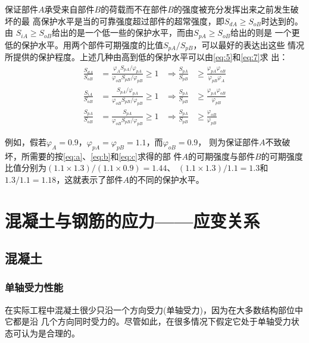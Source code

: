 \documentclass[12pt,a4paper]{book}
\begin{document}
保证部件$A$承受来自部件$B$的荷载而不在部件$B$的强度被充分发挥出来之前发生破坏的最
高保护水平是当的可靠强度超过部件的超常强度，即$S_{dA}\ge S_{oB}$时达到的。由
$S_{iA}\ge S_{oB}$给出的是一个低一些的保护水平，而由$S_{pA}\ge S_{oB}$给出的则是
一个更低的保护水平。用两个部件可期强度的比值$S_{pA}/S_{pB}$，可以最好的表达出这些
情况所提供的保护程度。上述几种由高到低的保护水平可以由\cref{eq:5}和\cref{eq:7}求
出：
\begin{subequations}
  \begin{align} \frac{S_{dA}}{S_{oB}} &= \frac{\varphi_A
S_{pA}/\varphi_{pA}}{\varphi_{oB} S_{pB}/\varphi_{pB}}\ge 1&
\Rightarrow\frac{S_{pA}}{S_{pB}} &\ge \frac{\varphi_{pA}
\varphi_{oB}}{\varphi_{pB} \varphi_{A}}\label{eq:a}\\ \frac{S_{iA}}{S_{oB}} &=
\frac{S_{pA}/\varphi_{pA}}{\varphi_{oB} S_{pB}/\varphi_{pB}}\ge 1 &
\Rightarrow\frac{S_{pA}}{S_{pB}} &\ge \frac{\varphi_{pA}
\varphi_{oB}}{\varphi_{pB}}\label{eq:b}\\ \frac{S_{pA}}{S_{oB}} &=
\frac{S_{pA}}{\varphi_{oB} S_{pB}/\varphi_{pB}}\ge 1 &
\Rightarrow\frac{S_{pA}}{S_{pB}} &\ge
\frac{\varphi_{oB}}{\varphi_{pB}}\label{eq:c}
  \end{align}
\end{subequations}

例如，假若$\varphi_A=0.9$，$\varphi_{pA}=\varphi_{pB}=1.1$，而$\varphi_{oB}=0.9$，
则为保证部件$A$不致破坏，所需要的按\cref{eq:a}、\cref{eq:b}和\cref{eq:c}求得的部
件$A$的可期强度与部件$B$的可期强度比值分别为$(1.1\times1.3)/(1.1\times0.9)=1.44$、
$(1.1\times1.3)/1.1=1.3$和$1.3/1.1=1.18$，这就表示了部件$A$的不同的保护水平。

\chapter{混凝土与钢筋的应力——应变关系}

\section{混凝土} 

\subsection{单轴受力性能}

在实际工程中混凝土很少只沿一个方向受力(单轴受力)，因为在大多数结构部位中它都是沿
几个方向同时受力的。尽管如此，在很多情况下假定它处于单轴受力状态可认为是合理的。
\end{document}
